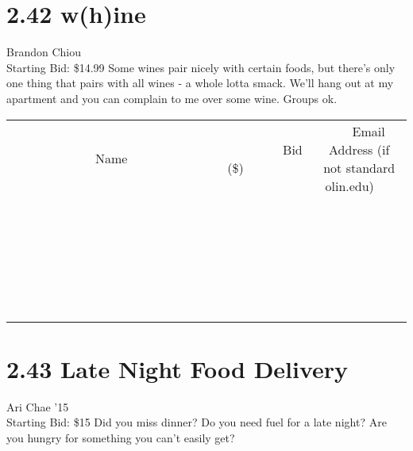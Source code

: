 \documentclass[11pt]{article}
\begin{document}
\section*{2.42 w(h)ine}
Brandon Chiou
\\
Starting Bid: \$14.99
\newline
Some wines pair nicely with certain foods, but there's only one thing that pairs with all wines - a whole lotta smack. We'll hang out at my apartment and you can complain to me over some wine. Groups ok.
\\[6ex]
\begin{tabular}{c c c}
~~~~~~~~~~~~~Name~~~~~~~~~~~~~ & ~~~~~~~~~Bid (\$)~~~~~~~~~  & ~~~Email Address (if not standard olin.edu)~~~\\
 & & \\
\hline
 & & \\
\hline
 & & \\
\hline
 & & \\
\hline
 & & \\
\hline
 & & \\
\hline
 & & \\
\hline
 & & \\
\hline
 & & \\
\hline
 & & \\
\hline
 & & \\
\hline
 & & \\
\hline
 & & \\
\hline
 & & \\
\hline
 & & \\
\hline
 & & \\
\hline
 & & \\
\hline
 & & \\
\hline
 & & \\
\hline
 & & \\
\hline
 & & \\
\hline
 & & \\
\hline
 & & \\
\hline
 & & \\
\hline
 & & \\
\hline
 & & \\
\hline
\end{tabular}
\newpage
\section*{2.43 Late Night Food Delivery}
Ari Chae '15
\\
Starting Bid: \$15
\newline
Did you miss dinner? Do you need fuel for a late night? Are you hungry for something you can't easily get?
\end{document}
